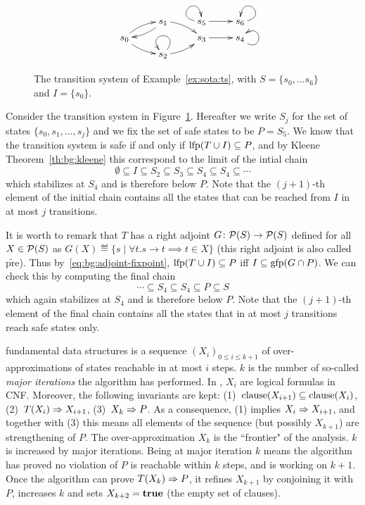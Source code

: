 \begin{example}\label{ex:sota:ts}
	\begin{figure}[t]
		\begin{displaymath}
			\xymatrix@R=5pt{
			& s_1 \ar@/^1ex/[rd] \ar@/^1ex/[ld] &  s_5 \ar@(l,u)\ar[r] & s_6 \ar@(r,u)\\
			s_0 \ar@/^1ex/[ur] \ar@/_1ex/[rd] & &s_3 \ar[r]& s_4\ar@(rd,ur) \\
			& s_2 \ar@(ur,ul) \ar@/_1ex/[ru] &
			}
		\end{displaymath}
		\caption{The transition system of Example~\ref{ex:sota:ts}, with $S = \{ s_0, \dots s_6 \}$ and $I=\{s_0\}$.}\label{fig:sota:ts}
	\end{figure}

	Consider the transition system in Figure~\ref{fig:sota:ts}. Hereafter we write $S_{j}$ for the set of states $\{s_0, s_1, \dots, s_j\}$ and we fix the set of safe states to be $P = S_5$.
	We know that the transition system is safe if and only if $\text{lfp}(T \cup I) \subseteq P$, and by Kleene Theorem~\ref{th:bg:kleene} this correspond to the limit of the intial chain
	\[
	\emptyset \subseteq  I \subseteq S_2 \subseteq S_3 \subseteq S_4 \subseteq S_4 \subseteq \cdots
	\]
	which stabilizes at $S_4$ and is therefore below $P$. Note that the $(j+1)$-th element of the initial chain contains all the states that can be reached from $I$ in at most $j$ transitions.

	It is worth to remark that $T$ has a right adjoint $G \colon \mathcal{P}(S) \to \mathcal{P}(S)$ defined for all $X \in \mathcal{P}(S)$ as $G(X) \eqdef \{s \mid \forall t. s \rightarrow t \implies t \in X \}$ (this right adjoint is also called $\widetilde{\text{pre}}$). Thus by~\eqref{eq:bg:adjoint-fixpoint}, $\text{lfp} (T \cup I) \subseteq P$ iff $I \subseteq \text{gfp} (G \cap P)$. We can check this by computing the final chain
	\[
	\cdots \subseteq S_4 \subseteq S_4 \subseteq P \subseteq S
	\]
	which again stabilizes at $S_4$ and is therefore below $P$. Note that the $(j+1)$-th element of the final chain contains all the states that in at most $j$ transitions reach safe states only.
\end{example}

 fundamental data structures is a sequence $(X_i)_{0 \le i \le k + 1}$ of over-approximations of states reachable in at most $i$ steps. $k$ is the number of so-called \emph{major iterations} the algorithm has performed.
In , $X_i$ are logical formulas in CNF. Moreover, the following invariants are kept: (1)~$\text{clause}(X_{i+1}) \subseteq \text{clause}(X_i)$, (2)~$T(X_i) \Rightarrow X_{i+1}$, (3)~$X_{k} \Rightarrow P$.
As a consequence, (1) implies $X_i \Rightarrow X_{i+1}$, and together with (3) this means all elements of the sequence (but possibly $X_{k+1}$) are strengthening of $P$. The over-approximation $X_k$ is the ``frontier" of the analysis. $k$ is increased by major iterations. Being at major iteration $k$ means the algorithm has proved no violation of $P$ is reachable within $k$ steps, and is working on $k + 1$. Once the algorithm can prove $T(X_k) \Rightarrow P$, it refines $X_{k+1}$ by conjoining it with $P$, increases $k$ and sets $X_{k+2} = \textbf{true}$ (the empty set of clauses).


